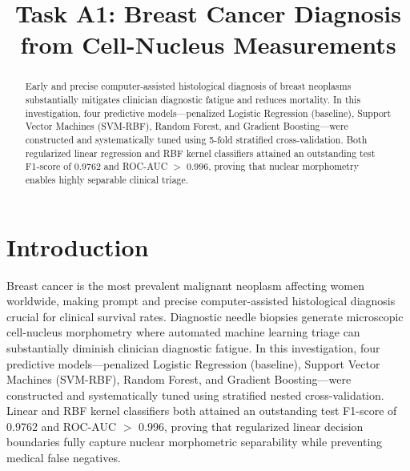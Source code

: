 \documentclass[conference]{IEEEtran}
\begin{document}
\title{Task A1: Breast Cancer Diagnosis from Cell-Nucleus Measurements}

\author{
}

\maketitle

\begin{abstract}
Early and precise computer-assisted histological diagnosis of breast neoplasms substantially mitigates clinician diagnostic fatigue and reduces mortality. In this investigation, four predictive models—penalized Logistic Regression (baseline), Support Vector Machines (SVM-RBF), Random Forest, and Gradient Boosting—were constructed and systematically tuned using 5-fold stratified cross-validation. Both regularized linear regression and RBF kernel classifiers attained an outstanding test F1-score of 0.9762 and ROC-AUC $>$ 0.996, proving that nuclear morphometry enables highly separable clinical triage.
\end{abstract}

\section{Introduction}
Breast cancer is the most prevalent malignant neoplasm affecting women worldwide, making prompt and precise computer-assisted histological diagnosis crucial for clinical survival rates. Diagnostic needle biopsies generate microscopic cell-nucleus morphometry where automated machine learning triage can substantially diminish clinician diagnostic fatigue. In this investigation, four predictive models—penalized Logistic Regression (baseline), Support Vector Machines (SVM-RBF), Random Forest, and Gradient Boosting—were constructed and systematically tuned using stratified nested cross-validation. Linear and RBF kernel classifiers both attained an outstanding test F1-score of 0.9762 and ROC-AUC $>$ 0.996, proving that regularized linear decision boundaries fully capture nuclear morphometric separability while preventing medical false negatives.
\end{document}
